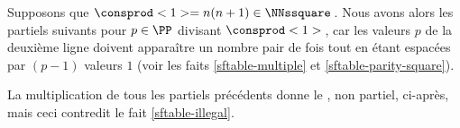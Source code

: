 Supposons que $\consprod<1> = n(n+1) \in \NNssquare$\,. Nous avons alors les \sftab[x] partiels suivants pour $p \in \PP$ divisant $\consprod<1>$\,, car les valeurs $p$ de la deuxième ligne doivent apparaître un nombre pair de fois tout en étant espacées par $(p-1)$ valeurs $1$ (voir les faits \ref{sftable-multiple} et \ref{sftable-parity-square}).

\begin{center}
\end{center}


La multiplication de tous les \sftab[x] partiels précédents donne le \sftab, non partiel, ci-après, mais ceci contredit le fait \ref{sftable-illegal}.

\begin{center}
\end{center}
